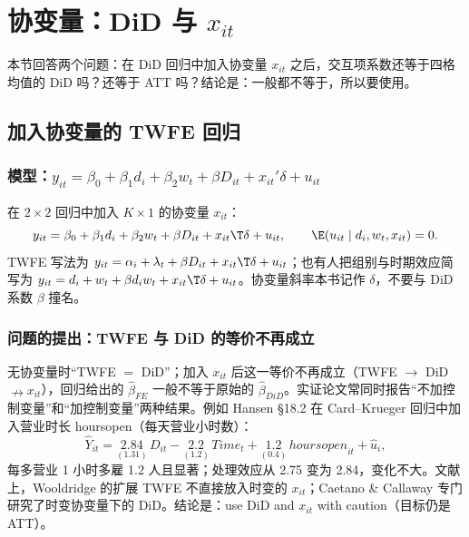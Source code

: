 \section{协变量：DiD 与 \texorpdfstring{$x_{it}$}{x\_it}}\label{sec:U15a-cov}

本节回答两个问题：在 DiD 回归中加入协变量 $x_{it}$ 之后，交互项系数还等于四格均值的 DiD 吗？还等于 ATT 吗？结论是：一般都不等于，所以要使用。

\subsection{加入协变量的 TWFE 回归}

\subsubsection{模型：\texorpdfstring{$y_{it}=\beta_0+\beta_1d_i+\beta_2w_t+\beta D_{it}+x_{it}'\delta+u_{it}$}{y = b0 + b1 d + b2 w + b D + x'delta + u}}

在 $2\times2$ 回归中加入 $K\times1$ 的协变量 $x_{it}$：
\begin{equation}\label{eq:U15a-cov}
y_{it}=\beta_0+\beta_1d_i+\beta_2w_t+\beta D_{it}+x_{it}\T\delta+u_{it},\qquad \E(u_{it}\mid d_i,w_t,x_{it})=0.
\end{equation}
TWFE 写法为 $y_{it}=\alpha_i+\lambda_t+\beta D_{it}+x_{it}\T\delta+u_{it}$；也有人把组别与时期效应简写为 $y_{it}=d_i+w_t+\beta d_iw_t+x_{it}\T\delta+u_{it}$。协变量斜率本书记作 $\delta$，不要与 DiD 系数 $\beta$ 撞名。

\subsubsection{问题的提出：TWFE 与 DiD 的等价不再成立}

无协变量时“TWFE $=$ DiD”；加入 $x_{it}$ 后这一等价不再成立（TWFE $\to$ DiD $\nrightarrow x_{it}$），回归给出的 $\hat\beta_{FE}$ 一般不等于原始的 $\hat\beta_{DiD}$。实证论文常同时报告“不加控制变量”和“加控制变量”两种结果。例如 Hansen §18.2 在 Card--Krueger 回归中加入营业时长 hoursopen（每天营业小时数）：
\[
\hat Y_{it}=\underset{(1.31)}{2.84}\,D_{it}-\underset{(1.2)}{2.2}\,\mathit{Time}_t+\underset{(0.4)}{1.2}\,\mathit{hoursopen}_{it}+\hat u_i,
\]
每多营业 1 小时多雇 1.2 人且显著；处理效应从 2.75 变为 2.84，变化不大。文献上，Wooldridge 的扩展 TWFE 不直接放入时变的 $x_{it}$；Caetano \& Callaway 专门研究了时变协变量下的 DiD。结论是：use DiD and $x_{it}$ with caution（目标仍是 ATT）。

